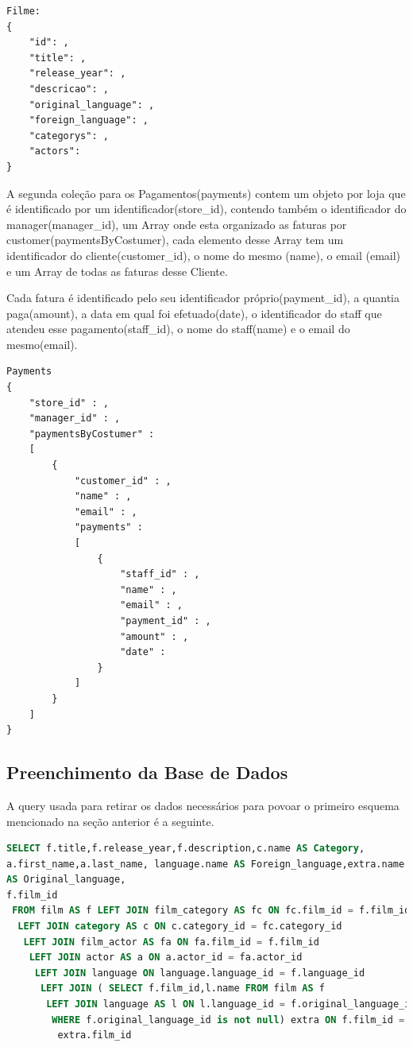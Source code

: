 \begin{lstlisting}[caption=Esquema da coleção films]
Filme:
{
	"id": , 
	"title": , 
	"release_year": , 
	"descricao": , 
	"original_language": , 
	"foreign_language": ,  
	"categorys": ,
	"actors":
}
\end{lstlisting}

A segunda coleção para os Pagamentos(payments) contem um objeto por loja que é identificado por um identificador(store\_id), contendo também o identificador do manager(manager\_id), um Array onde esta organizado as faturas por customer(paymentsByCostumer), cada elemento desse Array tem um identificador do cliente(customer\_id), o nome do mesmo (name), o email (email) e um Array de todas as faturas desse Cliente.

Cada fatura é identificado pelo seu identificador próprio(payment\_id), a quantia paga(amount), a data em qual foi efetuado(date), o identificador do staff que atendeu esse pagamento(staff\_id), o nome do staff(name) e o email do mesmo(email).

\begin{lstlisting}[caption=Esquema da coleção payments]
Payments
{
	"store_id" : ,
	"manager_id" : ,
	"paymentsByCostumer" : 
	[
		{
			"customer_id" : ,
			"name" : ,
			"email" : ,
			"payments" : 
			[
				{
					"staff_id" : ,
					"name" : ,
					"email" : ,
					"payment_id" : ,
					"amount" : ,
					"date" : 
				}
			]
		}
	]
}
\end{lstlisting}

\subsection{Preenchimento da Base de Dados}

A query usada para retirar os dados necessários para povoar o primeiro esquema mencionado na seção anterior é a seguinte.

\begin{lstlisting}[language=sql,caption=Query para povoar a primeira coleção]
SELECT f.title,f.release_year,f.description,c.name AS Category,
a.first_name,a.last_name, language.name AS Foreign_language,extra.name 
AS Original_language,
f.film_id 
 FROM film AS f LEFT JOIN film_category AS fc ON fc.film_id = f.film_id 
  LEFT JOIN category AS c ON c.category_id = fc.category_id 
   LEFT JOIN film_actor AS fa ON fa.film_id = f.film_id 
    LEFT JOIN actor AS a ON a.actor_id = fa.actor_id 
     LEFT JOIN language ON language.language_id = f.language_id 
      LEFT JOIN ( SELECT f.film_id,l.name FROM film AS f 
       LEFT JOIN language AS l ON l.language_id = f.original_language_id 
        WHERE f.original_language_id is not null) extra ON f.film_id = 
         extra.film_id
\end{lstlisting}


